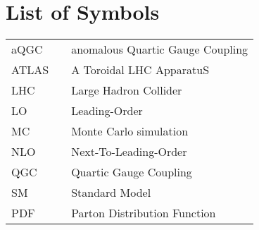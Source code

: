 \chapter*{List of Symbols}
  \begin{tabular}{lp{}p{}}
    aQGC        & \dotfill & anomalous Quartic Gauge Coupling \\
    ATLAS       & \dotfill & A Toroidal LHC ApparatuS \\
    LHC         & \dotfill & Large Hadron Collider \\
    LO          & \dotfill & Leading-Order \\
    MC          & \dotfill & Monte Carlo simulation \\
    NLO         & \dotfill & Next-To-Leading-Order \\
    QGC         & \dotfill & Quartic Gauge Coupling \\
    SM          & \dotfill & Standard Model  \\
    PDF         & \dotfill & Parton Distribution Function \\



  \end{tabular}

